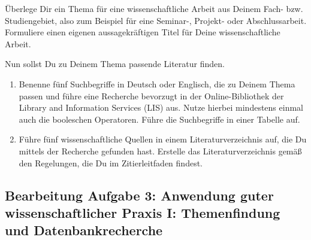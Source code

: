 
\begin{enumerate}
	\itshape{
	\item Überlege Dir ein Thema für eine wissenschaftliche Arbeit aus Deinem Fach- bzw. Studiengebiet, also zum Beispiel für eine Seminar-, Projekt- oder Abschlussarbeit. Formuliere einen eigenen aussagekräftigen Titel für Deine wissenschaftliche Arbeit.
	\item Nun sollst Du zu Deinem Thema passende Literatur finden.
	      \begin{enumerate}
		      \item Benenne fünf Suchbegriffe in Deutsch oder Englisch, die zu Deinem Thema passen und führe eine Recherche bevorzugt in der Online-Bibliothek der Library and Information Services (LIS) aus. Nutze hierbei mindestens einmal auch die booleschen Operatoren. Führe die Suchbegriffe in einer Tabelle auf.
		      \item Führe fünf wissenschaftliche Quellen in einem Literaturverzeichnis auf, die Du mittels der Recherche gefunden hast. Erstelle das Literaturverzeichnis gemäß den Regelungen, die Du im Zitierleitfaden findest.
	      \end{enumerate}}
\end{enumerate}

\clearpage

\subsection*{Bearbeitung Aufgabe 3: Anwendung guter wissenschaftlicher Praxis I: Themenfindung und Datenbankrecherche}

